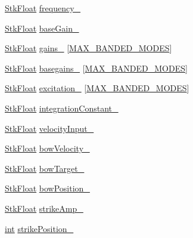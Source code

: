 \begin{DoxyCompactItemize}
\item 
\hyperlink{namespace_nyq_a044fa20a706520a617bbbf458a7db7e4}{Stk\+Float} \hyperlink{class_nyq_1_1_banded_w_g_ad4c87edb9869dfd022ec4cd327e5ad98}{frequency\+\_\+}
\item 
\hyperlink{namespace_nyq_a044fa20a706520a617bbbf458a7db7e4}{Stk\+Float} \hyperlink{class_nyq_1_1_banded_w_g_acabdf8457d2148ad2b685918bcdb5bad}{base\+Gain\+\_\+}
\item 
\hyperlink{namespace_nyq_a044fa20a706520a617bbbf458a7db7e4}{Stk\+Float} \hyperlink{class_nyq_1_1_banded_w_g_ab9be85990642478fd24711e9cb4bcf76}{gains\+\_\+} \mbox{[}\hyperlink{namespace_nyq_a3b6b7f1245b5eed8518a8240035c74cb}{M\+A\+X\+\_\+\+B\+A\+N\+D\+E\+D\+\_\+\+M\+O\+D\+ES}\mbox{]}
\item 
\hyperlink{namespace_nyq_a044fa20a706520a617bbbf458a7db7e4}{Stk\+Float} \hyperlink{class_nyq_1_1_banded_w_g_a08b6dfb8cc487d60654c509106c81132}{basegains\+\_\+} \mbox{[}\hyperlink{namespace_nyq_a3b6b7f1245b5eed8518a8240035c74cb}{M\+A\+X\+\_\+\+B\+A\+N\+D\+E\+D\+\_\+\+M\+O\+D\+ES}\mbox{]}
\item 
\hyperlink{namespace_nyq_a044fa20a706520a617bbbf458a7db7e4}{Stk\+Float} \hyperlink{class_nyq_1_1_banded_w_g_a062e9fb75af9fdc977b3af7b4c2c4281}{excitation\+\_\+} \mbox{[}\hyperlink{namespace_nyq_a3b6b7f1245b5eed8518a8240035c74cb}{M\+A\+X\+\_\+\+B\+A\+N\+D\+E\+D\+\_\+\+M\+O\+D\+ES}\mbox{]}
\item 
\hyperlink{namespace_nyq_a044fa20a706520a617bbbf458a7db7e4}{Stk\+Float} \hyperlink{class_nyq_1_1_banded_w_g_ac6889ab2b96c7cdc5a6a09c13ebe85a7}{integration\+Constant\+\_\+}
\item 
\hyperlink{namespace_nyq_a044fa20a706520a617bbbf458a7db7e4}{Stk\+Float} \hyperlink{class_nyq_1_1_banded_w_g_acf1b0598a9ef630371efb00555bfda3d}{velocity\+Input\+\_\+}
\item 
\hyperlink{namespace_nyq_a044fa20a706520a617bbbf458a7db7e4}{Stk\+Float} \hyperlink{class_nyq_1_1_banded_w_g_a44b37658ac5f9396c925d5a6c56f3704}{bow\+Velocity\+\_\+}
\item 
\hyperlink{namespace_nyq_a044fa20a706520a617bbbf458a7db7e4}{Stk\+Float} \hyperlink{class_nyq_1_1_banded_w_g_abf58018df083448ce70200e7db672c9d}{bow\+Target\+\_\+}
\item 
\hyperlink{namespace_nyq_a044fa20a706520a617bbbf458a7db7e4}{Stk\+Float} \hyperlink{class_nyq_1_1_banded_w_g_ad26a7e40e6869cf6dd8afb83f71e2069}{bow\+Position\+\_\+}
\item 
\hyperlink{namespace_nyq_a044fa20a706520a617bbbf458a7db7e4}{Stk\+Float} \hyperlink{class_nyq_1_1_banded_w_g_a868b3c2d2cd187b0da7b7f4af7d8420c}{strike\+Amp\+\_\+}
\item 
\hyperlink{xmltok_8h_a5a0d4a5641ce434f1d23533f2b2e6653}{int} \hyperlink{class_nyq_1_1_banded_w_g_a44de844e4f58281305d6cef2b2fee938}{strike\+Position\+\_\+}
\end{DoxyCompactItemize}
